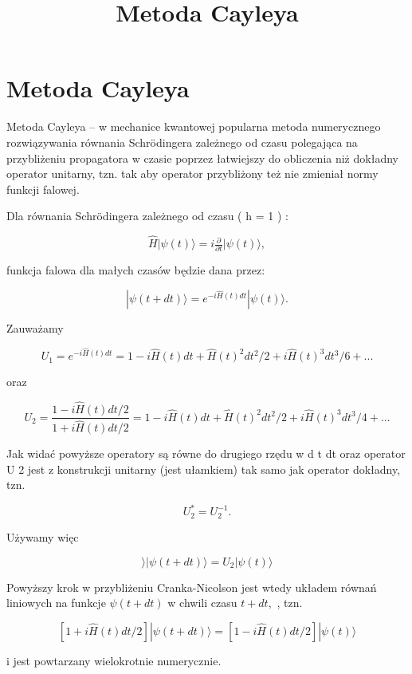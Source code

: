 \documentclass{article}
\begin{document}
\title{Metoda Cayleya}
\maketitle

\section{Metoda Cayleya}
Metoda Cayleya – w mechanice kwantowej popularna metoda numerycznego rozwiązywania równania Schrödingera zależnego od czasu polegająca na przybliżeniu propagatora w czasie poprzez łatwiejszy do obliczenia niż dokładny operator unitarny, tzn. tak aby operator przybliżony też nie zmieniał normy funkcji falowej.

Dla równania Schrödingera zależnego od czasu ( h = 1 ) :

    $$ { {\hat {H}}{\big |}\psi (t)\rangle =i{\tfrac {\partial }{\partial t}}{\big |}\psi (t)\rangle ,}$$

funkcja falowa dla małych czasów będzie dana przez:

    $$ { |\psi (t+dt)\rangle =e^{-i{\hat {H}}(t)dt}|\psi (t)\rangle .}$$

Zauważamy

    $$ { U_{1}=e^{-i{\hat {H}}(t)dt}=1-i{\hat {H}}(t)dt+{\hat {H}}(t)^{2}dt^{2}/2+i{\hat {H}}(t)^{3}dt^{3}/6+...}$$

oraz

    $$ { U_{2}={\frac {1-i{\hat {H}}(t)dt/2}{1+i{\hat {H}}(t)dt/2}}=1-i{\hat {H}}(t)dt+{\hat {H}}(t)^{2}dt^{2}/2+i{\hat {H}}(t)^{3}dt^{3}/4+...}$$

Jak widać powyższe operatory są równe do drugiego rzędu w d t dt oraz operator U 2  jest z konstrukcji unitarny (jest ułamkiem) tak samo jak operator dokładny, tzn.

    $$ { U_{2}^{*}=U_{2}^{-1}.}$$

Używamy więc

    $$⟩ |\psi(t+dt)\rangle=U_2|\psi(t)\rangle $$

Powyższy krok w przybliżeniu Cranka-Nicolson jest wtedy układem równań liniowych na funkcje $\psi(t+dt)$  w chwili czasu ${ t+dt,}$ ,  tzn.

    $$ { [{1+i{\hat {H}}(t)dt/2}]|\psi (t+dt)\rangle =[{1-i{\hat {H}}(t)dt/2}]|\psi (t)\rangle }$$

i jest powtarzany wielokrotnie numerycznie. 
\end{document}
